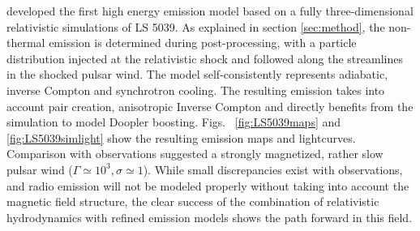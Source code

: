 \citep{2015A&A...581A..27D} developed the first high energy emission model based on a fully three-dimensional relativistic simulations of LS 5039.  As explained in section \ref{sec:method}, the non-thermal emission is determined during post-processing, with a particle distribution injected at the relativistic shock and followed along the streamlines in the shocked pulsar wind. The model self-consistently represents adiabatic, inverse Compton and synchrotron cooling. The resulting emission takes into account pair creation, anisotropic Inverse Compton and directly benefits from the simulation to model Doopler boosting.  Figs. ~\ref{fig:LS5039maps} and \ref{fig:LS5039simlight} show the resulting emission maps and lightcurves.  Comparison with observations suggested a strongly magnetized, rather slow pulsar wind ($\Gamma\simeq 10^3, \sigma \simeq 1$). While small discrepancies exist with observations, and radio emission will not be modeled properly without taking into account the magnetic field structure, the clear success of the combination of relativistic hydrodynamics with refined emission models shows the path forward in this field.

